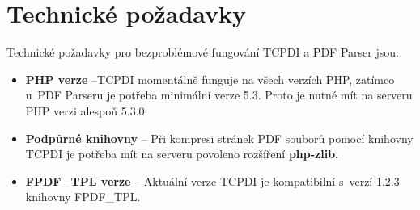 \section{Technické požadavky}
Technické požadavky pro bezproblémové fungování TCPDI a PDF Parser jsou:
\begin{itemize} 
	\item \textbf{PHP verze} --TCPDI  momentálně funguje na všech verzích PHP, zatímco u~PDF Parseru je potřeba minimální verze 5.3. Proto je nutné mít na serveru PHP verzi alespoň 5.3.0.
	\item \textbf{Podpůrné knihovny} -- Při kompresi stránek PDF souborů pomocí knihovny TCPDI je potřeba mít na serveru povoleno rozšíření \textbf{php-zlib}.
	\item \textbf{FPDF\_TPL verze} -- Aktuální verze TCPDI je kompatibilní s~verzí 1.2.3 knihovny FPDF\_TPL. 
\end{itemize}
